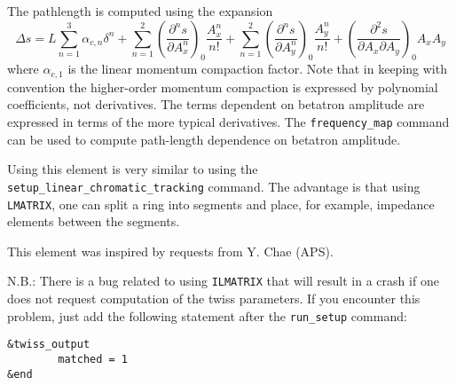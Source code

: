 The pathlength is computed using the expansion
\begin{equation}
\Delta s = L\sum_{n=1}^3 \alpha_{c,n} \delta^n + 
\sum_{n=1}^2 \left(\frac{\partial^n s}{\partial A_x^n}\right)_0 \frac{A_x^n}{n!} +
\sum_{n=1}^2 \left(\frac{\partial^n s}{\partial A_y^n}\right)_0 \frac{A_y^n}{n!} +
\left(\frac{\partial^2 s}{\partial A_x\partial A_y}\right)_0 A_x A_y
\end{equation}
where $\alpha_{c,1}$ is the linear momentum compaction factor.
Note that in keeping with convention the higher-order momentum compaction is expressed
by polynomial coefficients, not derivatives.
The terms dependent on betatron amplitude are expressed in terms of the more typical
derivatives.
The \verb|frequency_map| command can be used to compute path-length dependence on betatron
amplitude.

Using this element is very similar to using the \verb|setup_linear_chromatic_tracking| command.
The advantage is that using {\tt LMATRIX}, one can split a ring into segments
and place, for example, impedance elements between the segments.

This element was inspired by requests from Y. Chae (APS).

N.B.: There is a bug related to using {\tt ILMATRIX} that will result in a crash
if one does not request computation of the twiss parameters. If you encounter this
problem, just add the following statement after the \verb|run_setup| command:
\begin{verbatim}
&twiss_output
        matched = 1
&end
\end{verbatim}

